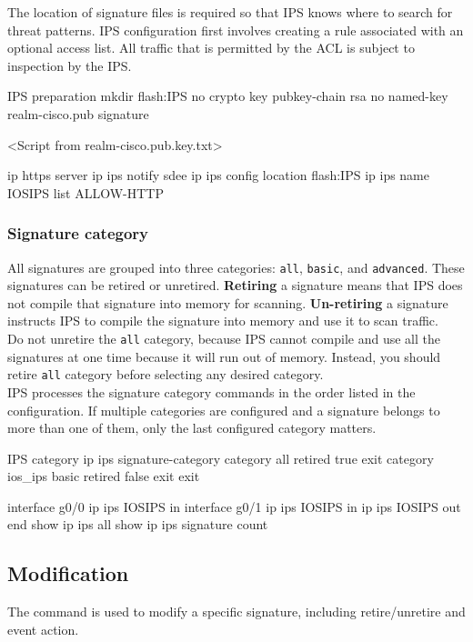 The location of signature files is required so that IPS knows where to search for threat patterns. IPS configuration first involves creating a rule associated with an optional access list. All traffic that is permitted by the ACL is subject to inspection by the IPS.

\begin{sexylisting}{IPS preparation}
mkdir flash:IPS
no crypto key pubkey-chain rsa
no named-key realm-cisco.pub signature

<Script from realm-cisco.pub.key.txt>

ip https server
ip ips notify sdee
ip ips config location flash:IPS
ip ips name IOSIPS list ALLOW-HTTP
\end{sexylisting}

\subsubsection{Signature category}

All signatures are grouped into three categories: \verb|all|, \verb|basic|, and \verb|advanced|. These signatures can be retired or unretired. \textbf{Retiring} a signature means that IPS does not compile that signature into memory for scanning. \textbf{Un-retiring} a signature instructs IPS to compile the signature into memory and use it to scan traffic.\\

Do not unretire the \verb|all| category, because IPS cannot compile and use all the signatures at one time because it will run out of memory. Instead, you should retire \verb|all| category before selecting any desired category.\\

IPS processes the signature category commands in the order listed in the configuration. If multiple categories are configured and a signature belongs to more than one of them, only the last configured category matters.

\begin{sexylisting}{IPS category}
ip ips signature-category
	category all
	retired true
	exit
  category ios_ips basic
  retired false
  exit
exit  

interface g0/0
  ip ips IOSIPS in
interface g0/1
  ip ips IOSIPS in
  ip ips IOSIPS out
  end
show ip ips all
show ip ips signature count  
\end{sexylisting}

\subsection{Modification}
The command  is used to modify a specific signature, including retire/unretire and event action.

